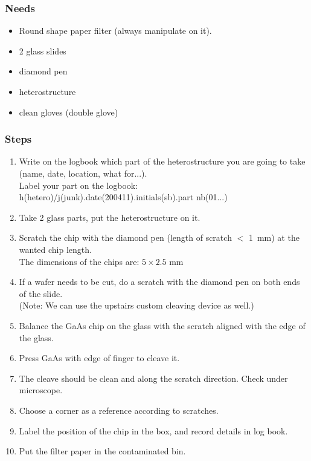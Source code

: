 \documentclass[12pt,a4paper]{report}
\begin{document}
\subsubsection{Needs}
\begin{itemize}[noitemsep]
\item Round shape paper filter (always manipulate on it).
\item 2 glass slides
\item diamond pen
\item heterostructure
\item clean gloves (double glove)
\end{itemize}
\subsubsection{Steps}
\begin{enumerate}
\item Write on the logbook which part of the heterostructure you are going to take (name, date, location, what for...).\\
Label your part on the logbook:\\
h(hetero)/j(junk).date(200411).initials(sb).part nb(01...)
\item Take 2 glass parts, put the heterostructure on it.
\item Scratch the chip with the diamond pen (length of scratch $<$ \SI{1}{\milli\meter}) at the wanted chip length.\\
The dimensions of the chips are:
$5 \times 2.5$ \si{\milli\meter}
\item If a wafer needs to be cut, do a scratch with the diamond pen on both ends of the slide.\\
(Note: We can use the upstairs custom cleaving device as well.)
\item Balance the GaAs chip on the glass with the scratch aligned with the edge of the glass.
\item Press GaAs with edge of finger to cleave it.
\item The cleave should be clean and along the scratch direction. Check under microscope.
\item Choose a corner as a reference according to scratches.
\item Label the position of the chip in the box, and record details in log book.
\item Put the filter paper in the contaminated bin.
\end{enumerate}

\newpage
\end{document}
